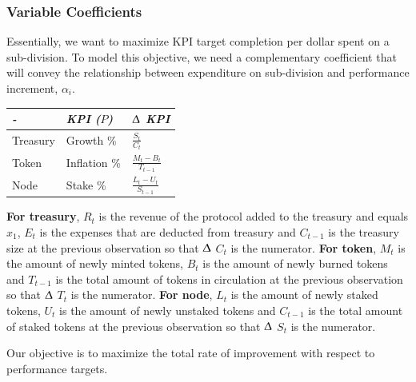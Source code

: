 \documentclass[conference,letterpaper]{IEEEtran}
\begin{document}
            \subsubsection{Variable Coefficients} 
                Essentially, we want to maximize KPI target completion per dollar spent on a
                sub-division. To model this objective, we need a complementary coefficient
                that will convey the relationship between expenditure on sub-division and
                performance increment, $\alpha_i$.
                \begin{center}
                    \begin{tabular}{|p{1.5cm}|p{2cm}|p{1.5cm}|}
                        \hline
                        \textit{-} & \textit{KPI ($P$)}& \textit{ $\Updelta$ KPI} \\
                        \hline
                        Treasury& Growth \%      & $\frac{S_t}{C_{t}}$  \\
                        Token   & Inflation \%   & $\frac{M_t - B_t}{T_{t-1}}$  \\
                        Node    & Stake \%       & $\frac{L_t - U_t}{S_{t-1}}$  \\
                        \hline
                    \end{tabular}
                \end{center}
                \textbf{For treasury}, $R_t$ is the revenue of the protocol added to the
                treasury and equals $x_1$, $E_t$ is the expenses that are deducted from
                treasury  and $C_{t-1}$ is the treasury size at the previous observation
                so that $\Updelta$ $C_t$ is the numerator.
                \newline
                \textbf{For token}, $M_t$ is the amount of newly minted tokens, $B_t$ is
                the amount of newly burned tokens and $T_{t-1}$ is the total amount of
                tokens in circulation at the previous observation so that $\Updelta$ $T_t$
                is the numerator.
                \newline
                \textbf{For node}, $L_t$ is the amount of newly staked tokens, $U_t$ is
                the amount of newly unstaked tokens and $C_{t-1}$ is the total amount of
                staked tokens at the previous observation so that $\Updelta$ $S_t$ is the
                numerator.
                
                Our objective is to maximize the total rate of improvement with respect to
                performance targets.
\end{document}
